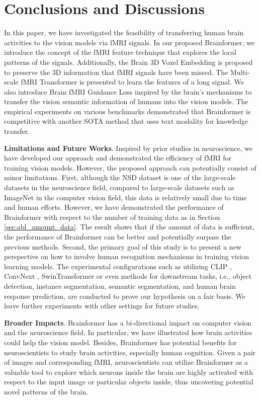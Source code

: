\section{Conclusions and Discussions}
In this paper, we have investigated the feasibility of transferring human brain activities to the vision models via fMRI signals. In our proposed Brainformer, we introduce the concept of the fMRI feature technique that explores the local patterns of the signals. Additionally, the Brain 3D Voxel Embedding is proposed to preserve the 3D information that fMRI signals have been missed. The Multi-scale fMRI Transformer is presented to learn the features of a long signal. We also introduce Brain fMRI Guidance Loss inspired by the brain's mechanisms to transfer the vision semantic information of humans into the vision models. The empirical experiments on various benchmarks demonstrated that Brainformer is competitive with another SOTA method that uses text modality for knowledge transfer.

\noindent
\textbf{Limitations and Future Works}. 
Inspired by prior studies in neuroscience, we have developed our approach and demonstrated the efficiency of fMRI for training vision models. However, the proposed approach can potentially consist of minor limitations. 
First, although the NSD dataset is one of the large-scale datasets in the neuroscience field, compared to large-scale datasets such as ImageNet \cite{imagenet} in the computer vision field, this data is relatively small due to time and human efforts. However, we have demonstrated the performance of Brainformer with respect to the number of training data as in Section \ref{sec:abl_amount_data}. The result shows that if the amount of data is sufficient, the performance of Brainformer can be better and potentially surpass the previous methods. Second, the primary goal of this study is to present a new perspective on how to involve human recognition mechanisms in training vision learning models. The experimental configurations such as utilizing CLIP \cite{clip}, ConvNext \cite{liu2022convnet}, SwinTransformer \cite{liu2021swin} or even methods for downstream tasks, i.e., object detection, instance segmentation, semantic segmentation, and human brain response prediction, are conducted to prove our hypothesis on a fair basis. We leave further experiments with other settings for future studies.

\noindent
\textbf{Broader Impacts}.
Brainformer has a bi-directional impact on computer vision and the neuroscience field. In particular, we have illustrated how brain activities could help the vision model. Besides, Brainformer has potential benefits for neuroscientists to study brain activities, especially human cognition. Given a pair of images and corresponding fMRI, neuroscientists can utilize Brainformer as a valuable tool to explore which neurons inside the brain are highly activated with respect to the input image or particular objects inside, thus uncovering potential novel patterns of the brain.
